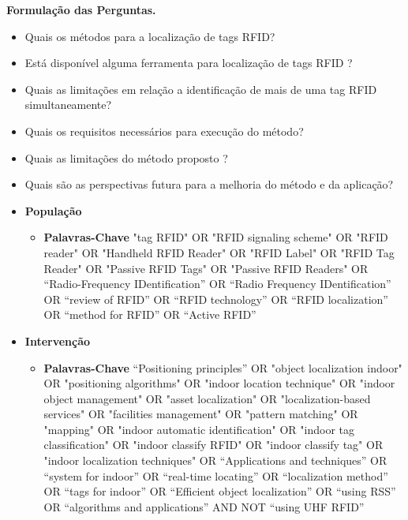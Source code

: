             \par
            \textbf{Formulação das Perguntas.}
            
            \begin{itemize}
              \item Quais os métodos para a localização de tags RFID?
              \item Está disponível alguma ferramenta para localização de tags RFID ?
              \item Quais as limitações em relação a identificação de mais de uma tag RFID simultaneamente?
              \item Quais os requisitos necessários para execução do método?
              \item Quais as limitações do método proposto ?
              \item Quais são as perspectivas futura para a melhoria do método e da aplicação?

            \end{itemize}
			
            \begin{itemize}
            \item \textbf{População}
            	\begin{itemize}
            		\item \textbf{Palavras-Chave} "tag RFID"  OR  "RFID signaling scheme"  OR  "RFID reader"  OR  "Handheld RFID Reader"  OR  "RFID Label"  OR  "RFID Tag Reader"  OR  "Passive RFID Tags"  OR  "Passive RFID Readers" OR “Radio-Frequency IDentification” OR “Radio Frequency IDentification”  OR “review of RFID” OR “RFID  technology” OR “RFID localization” OR “method for RFID” OR “Active RFID”
            	\end{itemize}
            \item \textbf{Intervenção } 
            	\begin{itemize}
            
             \item \textbf{Palavras-Chave} “Positioning principles” OR "object localization indoor"  OR  "positioning algorithms"  OR  "indoor location technique"  OR  "indoor object management"  OR  "asset localization"  OR  "localization-based services"  OR  "facilities management"  OR  "pattern matching"  OR  "mapping"  OR  "indoor automatic identification"  OR  "indoor tag classification"  OR  "indoor classify RFID"  OR  "indoor classify tag"  OR  "indoor localization techniques" OR “Applications and techniques” OR “system for indoor” OR “real-time locating” OR “localization method” OR “tags for indoor” OR “Efficient object localization” OR “using RSS” OR “algorithms and applications” AND NOT “using UHF RFID”
           		\end{itemize}
            \end{itemize}
             
